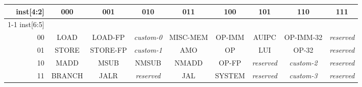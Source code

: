 \vspace{0.1in}
\begin{table*}[htbp]
\begin{center}
{\footnotesize
\setlength{\tabcolsep}{4pt}
\begin{tabular}{|r|c|c|c|c|c|c|c|c|}
  \hline
  inst[4:2] & 000    & 001      & 010            & 011      & 100    & 101            & 110                  & 111 \\ \cline{1-1}
  inst[6:5] &        &          &                &          &        &                &                      &   \\ \hline
         00 & LOAD   & LOAD-FP  & {\em custom-0} & MISC-MEM & OP-IMM & AUIPC          & OP-IMM-32            & {\em reserved}  \\ \hline
         01 & STORE  & STORE-FP & {\em custom-1} & AMO      & OP     & LUI            & OP-32                & {\em reserved}  \\ \hline
         10 & MADD   & MSUB     & NMSUB          & NMADD    & OP-FP  & {\em reserved} & {\em custom-2}       & {\em reserved}  \\ \hline
         11 & BRANCH & JALR     & {\em reserved} & JAL      & SYSTEM & {\em reserved} & {\em custom-3}       & {\em reserved}  \\ \hline

 \end{tabular}
}
\end{center}
\vspace{-0.15in}
\caption{RISC-V base opcode map, inst[1:0]=11}
\label{opcodemap}
\end{table*}
